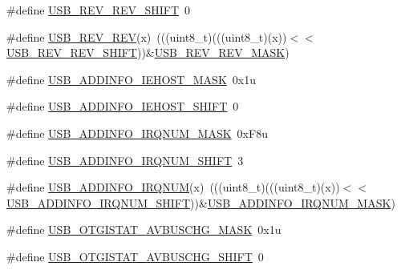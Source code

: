 \begin{DoxyCompactItemize}
\item 
\#define \hyperlink{group___u_s_b___register___masks_gab058ebe4be52454e46ef15ce015ac5fd}{U\+S\+B\+\_\+\+R\+E\+V\+\_\+\+R\+E\+V\+\_\+\+S\+H\+I\+FT}~0
\item 
\#define \hyperlink{group___u_s_b___register___masks_ga30e7698a3bfac84ce89aee7d2d0498f4}{U\+S\+B\+\_\+\+R\+E\+V\+\_\+\+R\+EV}(x)~(((uint8\+\_\+t)(((uint8\+\_\+t)(x))$<$$<$\hyperlink{group___u_s_b___register___masks_gab058ebe4be52454e46ef15ce015ac5fd}{U\+S\+B\+\_\+\+R\+E\+V\+\_\+\+R\+E\+V\+\_\+\+S\+H\+I\+FT}))\&\hyperlink{group___u_s_b___register___masks_ga72a356a066674e41e3827b0ccb931e71}{U\+S\+B\+\_\+\+R\+E\+V\+\_\+\+R\+E\+V\+\_\+\+M\+A\+SK})
\item 
\#define \hyperlink{group___u_s_b___register___masks_gacb7c792034c73c4861bc8fba6ff4314f}{U\+S\+B\+\_\+\+A\+D\+D\+I\+N\+F\+O\+\_\+\+I\+E\+H\+O\+S\+T\+\_\+\+M\+A\+SK}~0x1u
\item 
\#define \hyperlink{group___u_s_b___register___masks_gad256dcdfe8443877169b69dbcc8a041e}{U\+S\+B\+\_\+\+A\+D\+D\+I\+N\+F\+O\+\_\+\+I\+E\+H\+O\+S\+T\+\_\+\+S\+H\+I\+FT}~0
\item 
\#define \hyperlink{group___u_s_b___register___masks_gaa578584bfaf89e26213e6ba12e5f4b0e}{U\+S\+B\+\_\+\+A\+D\+D\+I\+N\+F\+O\+\_\+\+I\+R\+Q\+N\+U\+M\+\_\+\+M\+A\+SK}~0x\+F8u
\item 
\#define \hyperlink{group___u_s_b___register___masks_ga3332243caa9e2f9cfc49b031ac54cbda}{U\+S\+B\+\_\+\+A\+D\+D\+I\+N\+F\+O\+\_\+\+I\+R\+Q\+N\+U\+M\+\_\+\+S\+H\+I\+FT}~3
\item 
\#define \hyperlink{group___u_s_b___register___masks_ga0ab998135e9b4c5e89fa598b54bf96a3}{U\+S\+B\+\_\+\+A\+D\+D\+I\+N\+F\+O\+\_\+\+I\+R\+Q\+N\+UM}(x)~(((uint8\+\_\+t)(((uint8\+\_\+t)(x))$<$$<$\hyperlink{group___u_s_b___register___masks_ga3332243caa9e2f9cfc49b031ac54cbda}{U\+S\+B\+\_\+\+A\+D\+D\+I\+N\+F\+O\+\_\+\+I\+R\+Q\+N\+U\+M\+\_\+\+S\+H\+I\+FT}))\&\hyperlink{group___u_s_b___register___masks_gaa578584bfaf89e26213e6ba12e5f4b0e}{U\+S\+B\+\_\+\+A\+D\+D\+I\+N\+F\+O\+\_\+\+I\+R\+Q\+N\+U\+M\+\_\+\+M\+A\+SK})
\item 
\#define \hyperlink{group___u_s_b___register___masks_ga4aed6ee50bdd46063aa551dfb6e91d80}{U\+S\+B\+\_\+\+O\+T\+G\+I\+S\+T\+A\+T\+\_\+\+A\+V\+B\+U\+S\+C\+H\+G\+\_\+\+M\+A\+SK}~0x1u
\item 
\#define \hyperlink{group___u_s_b___register___masks_ga0b762b08ffd3b747e2d0ad17b5f1641a}{U\+S\+B\+\_\+\+O\+T\+G\+I\+S\+T\+A\+T\+\_\+\+A\+V\+B\+U\+S\+C\+H\+G\+\_\+\+S\+H\+I\+FT}~0
\item 

\end{DoxyCompactItemize}
